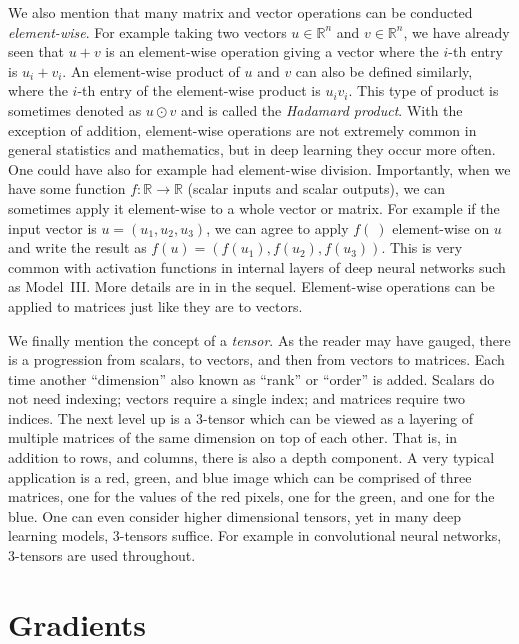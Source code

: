 \documentclass[12pt]{article}
\begin{document}
We also mention that many matrix and vector operations can be conducted {\em element-wise}. For example taking two vectors $u \in {\mathbb R}^n$ and $v \in {\mathbb R}^n$, we have already seen that $u+v$ is an element-wise operation giving a vector where the $i$-th entry is $u_i+v_i$. An element-wise product of $u$ and $v$ can also be defined similarly, where the $i$-th entry of the element-wise product is $u_i v_i$. This type of product is sometimes denoted as $u \odot v$ and is called the {\em Hadamard product}. With the exception of addition, element-wise operations are not extremely common in general statistics and mathematics, but in deep learning they occur more often. One could have also for example had element-wise division. Importantly, when we have some function $f: {\mathbb R} \to {\mathbb R}$ (scalar inputs and scalar outputs), we can sometimes apply it element-wise to a whole vector or matrix. For example if the input vector is $u = (u_1, u_2, u_3)$, we can agree to apply $f(~)$ element-wise on $u$ and write the result as $f(u) = (f(u_1), f(u_2), f(u_3))$. This is very common with activation functions in internal layers of deep neural networks such as Model~III. More details are in in the sequel. Element-wise operations can be applied to matrices just like they are to vectors.

We finally mention the concept of a {\em tensor}. As the reader may have gauged, there is a progression from scalars, to vectors, and then from vectors to matrices. Each time another ``dimension'' also known as ``rank'' or ``order'' is added. Scalars do not need indexing; vectors require a single index; and matrices require two indices. The next level up is a $3$-tensor which can be viewed as a layering of multiple matrices of the same dimension on top of each other. That is, in addition to rows, and columns, there is also a depth component. A very typical application is a red, green, and blue image which can be comprised of three matrices, one for the values of the red pixels, one for the green, and one for the blue. One can even consider higher dimensional tensors, yet in many deep learning models, $3$-tensors suffice. For example in convolutional neural networks, $3$-tensors are used throughout.

\section{Gradients}
\label{sec:gradient}
\end{document}
